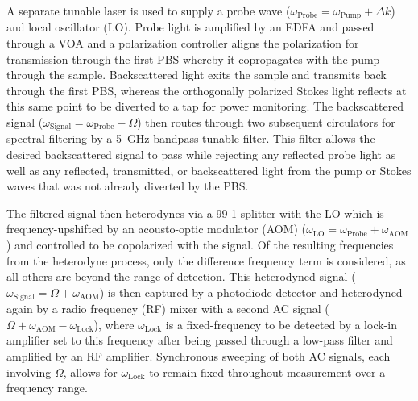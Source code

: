 A separate tunable laser is used to supply a probe wave (\(\omega_{\mathrm{Probe}} = \omega_{\mathrm{Pump}} + \Delta k\)) and local oscillator (LO). Probe light is amplified by an EDFA and passed through a VOA and a polarization controller aligns the polarization for transmission through the first PBS whereby it copropagates with the pump through the sample. Backscattered light exits the sample and transmits back through the first PBS, whereas the orthogonally polarized Stokes light reflects at this same point to be diverted to a tap for power monitoring. The backscattered signal (\(\omega_{\mathrm{Signal}} = \omega_{\mathrm{Probe}} - \Omega\)) then routes through two subsequent circulators for spectral filtering by a \SI{5}{\giga\hertz} bandpass tunable filter. This filter allows the desired backscattered signal to pass while rejecting any reflected probe light as well as any reflected, transmitted, or backscattered light from the pump or Stokes waves that was not already diverted by the PBS.

The filtered signal then heterodynes via a 99-1 splitter with the LO which is frequency-upshifted by an acousto-optic modulator (AOM) (\(\omega_{\mathrm{LO}} = \omega_{\mathrm{Probe}} + \omega_{\mathrm{AOM}}\)) and controlled to be copolarized with the signal. Of the resulting frequencies from the heterodyne process, only the difference frequency term is considered, as all others are beyond the range of detection. This heterodyned signal (\(\omega_{\mathrm{Signal}} = \Omega + \omega_{\mathrm{AOM}}\)) is then captured by a photodiode detector and heterodyned again by a radio frequency (RF) mixer with a second AC signal (\(\Omega + \omega_{\mathrm{AOM}} - \omega_{\mathrm{Lock}}\)), where \(\omega_{\mathrm{Lock}}\) is a fixed-frequency to be detected by a lock-in amplifier set to this frequency after being passed through a low-pass filter and amplified by an RF amplifier. Synchronous sweeping of both AC signals, each involving \(\Omega\), allows for \(\omega_{\mathrm{Lock}}\) to remain fixed throughout measurement over a frequency range.

